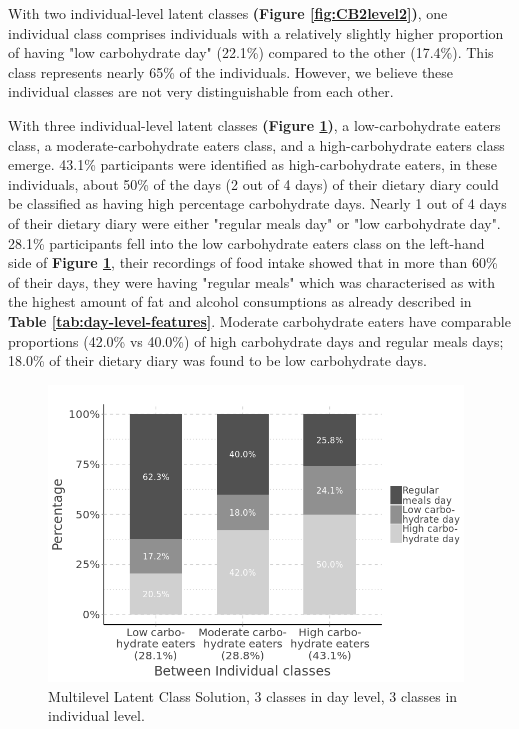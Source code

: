With two individual-level latent classes \textbf{(Figure \ref{fig:CB2level2})}, one individual class comprises individuals with a relatively slightly higher proportion of having "low carbohydrate day" (22.1\%) compared to the other (17.4\%). This class represents nearly 65\% of the individuals. However, we believe these individual classes are not very distinguishable from each other.

With three individual-level latent classes \textbf{(Figure \ref{fig:level2})}, a low-carbohydrate eaters class, a moderate-carbohydrate eaters class, and a high-carbohydrate eaters class emerge. 43.1\% participants were identified as high-carbohydrate eaters, in these individuals, about 50\% of the days (2 out of 4 days) of their dietary diary could be classified as having high percentage carbohydrate days. Nearly 1 out of 4 days of their dietary diary were either "regular meals day" or "low carbohydrate day". 28.1\% participants fell into the low carbohydrate eaters class on the left-hand side of \textbf{Figure \ref{fig:level2}}, their recordings of food intake showed that in more than 60\% of their days, they were having "regular meals" which was characterised as with the highest amount of fat and alcohol consumptions as already described in \textbf{Table \ref{tab:day-level-features}}. Moderate carbohydrate eaters have comparable proportions (42.0\% vs 40.0\%) of high carbohydrate days and regular meals days; 18.0\% of their dietary diary was found to be low carbohydrate days.

\begin{figure}
	\centering
	\includegraphics[width=11cm]{Figures/level2.png}
	\decoRule
	\caption[Multilevel Latent Class Solution ($3\times3$).]{Multilevel Latent Class Solution, 3 classes in day level, 3 classes in individual level.}
	\label{fig:level2}
\end{figure}

